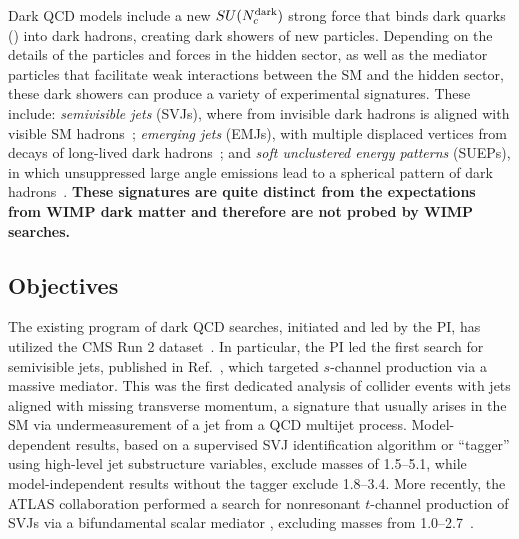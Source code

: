 Dark QCD models include a new $SU(N_{c}^{\text{dark}})$ strong force that binds dark quarks (\Pqdark) into dark hadrons, creating dark showers of new particles.
Depending on the details of the particles and forces in the hidden sector,
as well as the mediator particles that facilitate weak interactions between the SM and the hidden sector,
these dark showers can produce a variety of experimental signatures.
These include: \emph{semivisible jets} (SVJs), where \met from invisible dark hadrons is aligned with visible SM hadrons~\cite{Cohen:2015toa};
\emph{emerging jets} (EMJs), with multiple displaced vertices from decays of long-lived dark hadrons~\cite{Schwaller:2015gea};
and \emph{soft unclustered energy patterns} (SUEPs), in which unsuppressed large angle emissions lead to a spherical pattern of dark hadrons~\cite{Knapen:2016hky}.
\textbf{These signatures are quite distinct from the expectations from WIMP dark matter and therefore are not probed by WIMP searches.}

\subsection{Objectives}\label{subsec:dmobj}

The existing program of dark QCD searches, initiated and led by the PI, has utilized the CMS Run 2 dataset~\cite{Sirunyan:2018njd,CMS:2021dzg,CMS:2024nca,CMS:2024gxp}.
In particular, the PI led the first search for semivisible jets, published in Ref.~\cite{CMS:2021dzg}, which targeted $s$-channel production via a massive \PZprime mediator.
This was the first dedicated analysis of collider events with jets aligned with missing transverse momentum,
a signature that usually arises in the SM via undermeasurement of a jet from a QCD multijet process.
Model-dependent results, based on a supervised SVJ identification algorithm or ``tagger'' using high-level jet substructure variables, exclude \PZprime masses of 1.5--5.1\TeV,
while model-independent results without the tagger exclude 1.8--3.4\TeV.
More recently, the ATLAS collaboration performed a search for nonresonant $t$-channel production of SVJs via a bifundamental scalar mediator \Pbifun,
excluding masses from 1.0--2.7\TeV~\cite{ATLAS:2023swa}.

